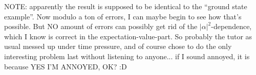 \documentclass[english, parskip=full]{scrartcl}
\begin{document}
NOTE: apparently the result is supposed to be identical to the ``ground state example''.
Now modulo a ton of errors, I can maybe begin to see how that's possible. 
But NO amount of errors can possibly get rid of the $|\alpha|^2$-dependence, which I know is correct in the expectation-value-part.
So probably the tutor as usual messed up under time pressure, and of course chose to do the only interesting problem last without listening to anyone... if I sound annoyed, it is because YES I'M ANNOYED, OK? :D

\end{document}
